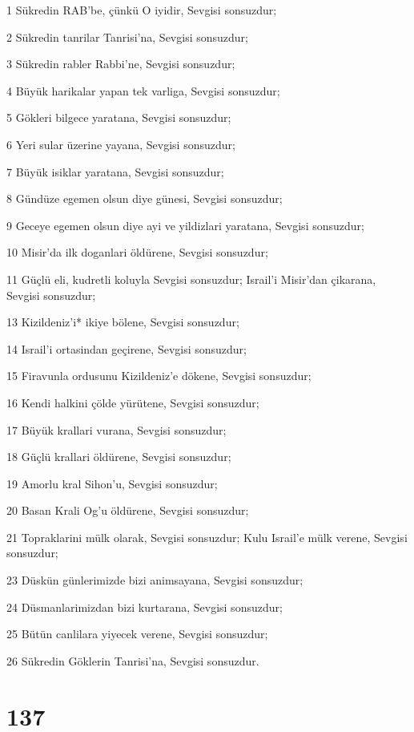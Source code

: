 \par 1 Sükredin RAB'be, çünkü O iyidir, Sevgisi sonsuzdur;
\par 2 Sükredin tanrilar Tanrisi'na, Sevgisi sonsuzdur;
\par 3 Sükredin rabler Rabbi'ne, Sevgisi sonsuzdur;
\par 4 Büyük harikalar yapan tek varliga, Sevgisi sonsuzdur;
\par 5 Gökleri bilgece yaratana, Sevgisi sonsuzdur;
\par 6 Yeri sular üzerine yayana, Sevgisi sonsuzdur;
\par 7 Büyük isiklar yaratana, Sevgisi sonsuzdur;
\par 8 Gündüze egemen olsun diye günesi, Sevgisi sonsuzdur;
\par 9 Geceye egemen olsun diye ayi ve yildizlari yaratana, Sevgisi sonsuzdur;
\par 10 Misir'da ilk doganlari öldürene, Sevgisi sonsuzdur;
\par 11 Güçlü eli, kudretli koluyla Sevgisi sonsuzdur; Israil'i Misir'dan çikarana, Sevgisi sonsuzdur;
\par 13 Kizildeniz'i* ikiye bölene, Sevgisi sonsuzdur;
\par 14 Israil'i ortasindan geçirene, Sevgisi sonsuzdur;
\par 15 Firavunla ordusunu Kizildeniz'e dökene, Sevgisi sonsuzdur;
\par 16 Kendi halkini çölde yürütene, Sevgisi sonsuzdur;
\par 17 Büyük krallari vurana, Sevgisi sonsuzdur;
\par 18 Güçlü krallari öldürene, Sevgisi sonsuzdur;
\par 19 Amorlu kral Sihon'u, Sevgisi sonsuzdur;
\par 20 Basan Krali Og'u öldürene, Sevgisi sonsuzdur;
\par 21 Topraklarini mülk olarak, Sevgisi sonsuzdur; Kulu Israil'e mülk verene, Sevgisi sonsuzdur;
\par 23 Düskün günlerimizde bizi animsayana, Sevgisi sonsuzdur;
\par 24 Düsmanlarimizdan bizi kurtarana, Sevgisi sonsuzdur;
\par 25 Bütün canlilara yiyecek verene, Sevgisi sonsuzdur;
\par 26 Sükredin Göklerin Tanrisi'na, Sevgisi sonsuzdur.

\chapter{137}

